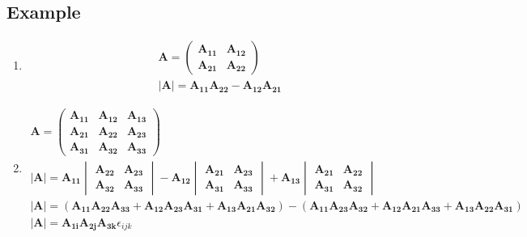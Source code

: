 \documentclass[a4paper, 11pt, normalem]{report}
\begin{document}
\subsection{Example}
\begin{enumerate}
    \item   \begin{gather*}
                \mathbf{A} =
                \begin{pmatrix}
                    \mathbf{A_{11}} & \mathbf{A_{12}} \\
                    \mathbf{A_{21}} & \mathbf{A_{22}}
                \end{pmatrix} \\
                \mathbf{|A|} = \mathbf{A_{11}A_{22}} - \mathbf{A_{12}A_{21}}
            \end{gather*}
    \item   \begin{gather*}
                \mathbf{A} =
                \begin{pmatrix}
                    \mathbf{A_{11}} & \mathbf{A_{12}} & \mathbf{A_{13}} \\
                    \mathbf{A_{21}} & \mathbf{A_{22}} & \mathbf{A_{23}} \\
                    \mathbf{A_{31}} & \mathbf{A_{32}} & \mathbf{A_{33}}
                \end{pmatrix} \\
                \mathbf{|A|} = \mathbf{A_{11}}
                \begin{vmatrix}
                    \mathbf{A_{22}} & \mathbf{A_{23}} \\
                    \mathbf{A_{32}} & \mathbf{A_{33}}
                \end{vmatrix} - \mathbf{A_{12}}
                \begin{vmatrix}
                    \mathbf{A_{21}} & \mathbf{A_{23}} \\
                    \mathbf{A_{31}} & \mathbf{A_{33}}
                \end{vmatrix} + \mathbf{A_{13}}
                \begin{vmatrix}
                    \mathbf{A_{21}} & \mathbf{A_{22}} \\
                    \mathbf{A_{31}} & \mathbf{A_{32}}
                \end{vmatrix} \\
                \mathbf{|A|} = (\mathbf{A_{11}A_{22}A_{33}} + \mathbf{A_{12}A_{23}A_{31}} + \mathbf{A_{13}A_{21}A_{32}}) - (\mathbf{A_{11}A_{23}A_{32}} + \mathbf{A_{12}A_{21}A_{33}} + \mathbf{A_{13}A_{22}A_{31}}) \\
                \mathbf{|A|} = \mathbf{A_{1i}A_{2j}A_{3k}}\epsilon_{ijk}
            \end{gather*}
\end{enumerate}
\end{document}
